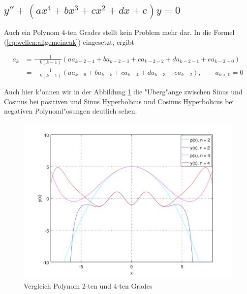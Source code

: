 \subsection{\texorpdfstring{$y''+(ax^4+bx^3+cx^2+dx+e)y = 
0$}{y''-(ax4+bx3+cx2+dx+e)y = 0}}

Auch ein Polynom $4$-ten Grades stellt kein Problem mehr dar. In die 
Formel (\ref{eq:wellen:allgemeineak}) eingesetzt, ergibt

\begin{equation*}
	\begin{split}
		a_k &= -\frac{1}{k(k-1)} (aa_{k-2-4} + 
		ba_{k-2-3} + ca_{k-2-2} + da_{k-2-1} +ea_{k-2-0})
		\\
		&= -\frac{1}{k(k-1)} (aa_{k-6} + ba_{k-5} + 
		ca_{k-4} + da_{k-3} +ea_{k-2}), \qquad a_{k<0} = 0
	\end{split}
\end{equation*}

Auch hier k"onnen wir in der Abbildung \ref{fig:wellen:poly4-dgl} die 
"Uberg"ange zwischen Sinus und Cosinus bei positiven und Sinus Hyperbolicus und 
Cosinus Hyperbolicus bei negativen Polynoml"osungen deutlich sehen.

\begin{figure}
	\includegraphics[scale=0.65]{./wellen/images/allgemein/n4.pdf}
	\caption{Vergleich Polynom 2-ten und 4-ten Grades}
	\label{fig:wellen:poly4-dgl}
\end{figure}